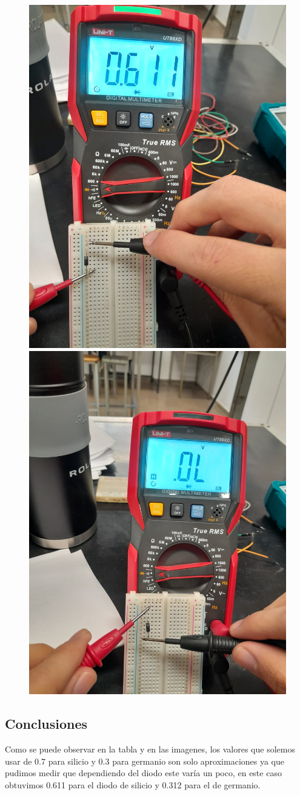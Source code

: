 \begin{figure}[h!]
    \centering
    \includegraphics[width=0.45\linewidth]{imagenes/silicio_directa.jpg}
    \hspace{0.05\linewidth}
    \includegraphics[width=0.45\linewidth]{imagenes/silicio_inversa.jpg}
\end{figure}

\subsection{Conclusiones}
Como se puede observar en la tabla y en las imagenes, los valores que solemos usar de 0.7 para silicio y 0.3 para germanio son solo aproximaciones ya que pudimos medir que dependiendo del diodo este varía un poco, en este caso obtuvimos 0.611 para el diodo de silicio y 0.312 para el de germanio.

